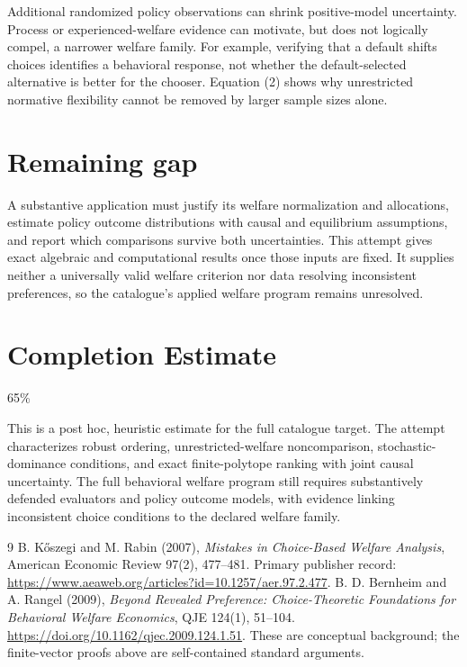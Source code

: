 \documentclass[11pt,a4paper]{article}
\begin{document}
Additional randomized policy observations can shrink positive-model uncertainty. Process or experienced-welfare evidence can motivate, but does not logically compel, a narrower welfare family. For example, verifying that a default shifts choices identifies a behavioral response, not whether the default-selected alternative is better for the chooser. Equation (2) shows why unrestricted normative flexibility cannot be removed by larger sample sizes alone.

\section{Remaining gap}
A substantive application must justify its welfare normalization and allocations, estimate policy outcome distributions with causal and equilibrium assumptions, and report which comparisons survive both uncertainties. This attempt gives exact algebraic and computational results once those inputs are fixed. It supplies neither a universally valid welfare criterion nor data resolving inconsistent preferences, so the catalogue's applied welfare program remains unresolved.

\section{Completion Estimate}
65\%

This is a post hoc, heuristic estimate for the full catalogue target.
The attempt characterizes robust ordering, unrestricted-welfare noncomparison, stochastic-dominance conditions, and exact finite-polytope ranking with joint causal uncertainty. The full behavioral welfare program still requires substantively defended evaluators and policy outcome models, with evidence linking inconsistent choice conditions to the declared welfare family.

\begin{thebibliography}{9}
 B. K\H{o}szegi and M. Rabin (2007), \emph{Mistakes in Choice-Based Welfare Analysis}, American Economic Review 97(2), 477--481. Primary publisher record: \url{https://www.aeaweb.org/articles?id=10.1257/aer.97.2.477}.
 B. D. Bernheim and A. Rangel (2009), \emph{Beyond Revealed Preference: Choice-Theoretic Foundations for Behavioral Welfare Economics}, QJE 124(1), 51--104. \url{https://doi.org/10.1162/qjec.2009.124.1.51}. These are conceptual background; the finite-vector proofs above are self-contained standard arguments.
\end{thebibliography}
\end{document}
